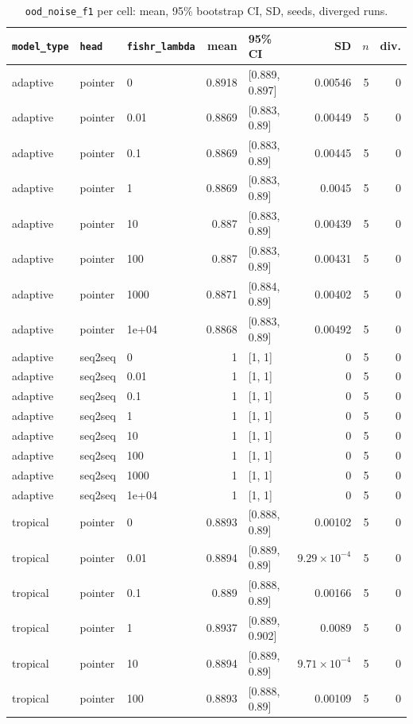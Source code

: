 \documentclass[10pt]{article}
\begin{document}
{\small
\begin{longtable}{lllrlrrr}
\caption{\texttt{ood\_noise\_f1} per cell: mean, 95\% bootstrap CI, SD, seeds, diverged runs.}\label{tab:summary-ood_noise_f1}\\
\toprule
\texttt{model\_type} & \texttt{head} & \texttt{fishr\_lambda} & mean & 95\% CI & SD & $n$ & div.\\
\midrule
\endhead
adaptive & pointer & 0 & 0.8918 & [0.889, 0.897] & 0.00546 & 5 & 0\\
adaptive & pointer & 0.01 & 0.8869 & [0.883, 0.89] & 0.00449 & 5 & 0\\
adaptive & pointer & 0.1 & 0.8869 & [0.883, 0.89] & 0.00445 & 5 & 0\\
adaptive & pointer & 1 & 0.8869 & [0.883, 0.89] & 0.0045 & 5 & 0\\
adaptive & pointer & 10 & 0.887 & [0.883, 0.89] & 0.00439 & 5 & 0\\
adaptive & pointer & 100 & 0.887 & [0.883, 0.89] & 0.00431 & 5 & 0\\
adaptive & pointer & 1000 & 0.8871 & [0.884, 0.89] & 0.00402 & 5 & 0\\
adaptive & pointer & 1e+04 & 0.8868 & [0.883, 0.89] & 0.00492 & 5 & 0\\
adaptive & seq2seq & 0 & 1 & [1, 1] & 0 & 5 & 0\\
adaptive & seq2seq & 0.01 & 1 & [1, 1] & 0 & 5 & 0\\
adaptive & seq2seq & 0.1 & 1 & [1, 1] & 0 & 5 & 0\\
adaptive & seq2seq & 1 & 1 & [1, 1] & 0 & 5 & 0\\
adaptive & seq2seq & 10 & 1 & [1, 1] & 0 & 5 & 0\\
adaptive & seq2seq & 100 & 1 & [1, 1] & 0 & 5 & 0\\
adaptive & seq2seq & 1000 & 1 & [1, 1] & 0 & 5 & 0\\
adaptive & seq2seq & 1e+04 & 1 & [1, 1] & 0 & 5 & 0\\
tropical & pointer & 0 & 0.8893 & [0.888, 0.89] & 0.00102 & 5 & 0\\
tropical & pointer & 0.01 & 0.8894 & [0.889, 0.89] & $9.29\times10^{-4}$ & 5 & 0\\
tropical & pointer & 0.1 & 0.889 & [0.888, 0.89] & 0.00166 & 5 & 0\\
tropical & pointer & 1 & 0.8937 & [0.889, 0.902] & 0.0089 & 5 & 0\\
tropical & pointer & 10 & 0.8894 & [0.889, 0.89] & $9.71\times10^{-4}$ & 5 & 0\\
tropical & pointer & 100 & 0.8893 & [0.888, 0.89] & 0.00109 & 5 & 0\\

\end{longtable}}
\end{document}

